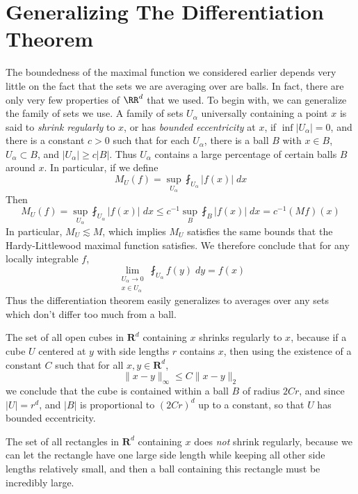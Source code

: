 \section{Generalizing The Differentiation Theorem}

The boundedness of the maximal function we considered earlier depends very little on the fact that the sets we are averaging over are balls. In fact, there are only very few properties of $\RR^d$ that we used. To begin with, we can generalize the family of sets we use. A family of sets $U_\alpha$ universally containing a point $x$ is said to \emph{shrink regularly} to $x$, or has \emph{bounded eccentricity} at $x$, if $\inf |U_\alpha| = 0$, and there is a constant $c > 0$ such that for each $U_\alpha$, there is a ball $B$ with $x \in B$, $U_\alpha \subset B$, and $|U_\alpha| \geq c |B|$. Thus $U_\alpha$ contains a large percentage of certain balls $B$ around $x$. In particular, if we define
%
\[ M_U(f) = \sup_{U_\alpha} \fint_{U_\alpha} |f(x)|\; dx \]
%
Then
%
\[ M_U(f) = \sup_{U_\alpha} \fint_{U_\alpha} |f(x)|\; dx \leq c^{-1} \sup_B \fint_B |f(x)|\; dx = c^{-1} (Mf)(x) \]
%
In particular, $M_U \lesssim M$, which implies $M_U$ satisfies the same bounds that the Hardy-Littlewood maximal function satisfies. We therefore conclude that for any locally integrable $f$,
%
\[ \lim_{\substack{U_\alpha \to 0\\x \in U_\alpha}} \fint_{U_\alpha} f(y)\;dy = f(x) \]
%
Thus the differentiation theorem easily generalizes to averages over any sets which don't differ too much from a ball.

\begin{example}
    The set of all open cubes in $\mathbf{R}^d$ containing $x$ shrinks regularly to $x$, because if a cube $U$ centered at $y$ with side lengths $r$ contains $x$, then using the existence of a constant $C$ such that for all $x,y \in \mathbf{R}^d$,
    \[ \| x - y \|_\infty \leq C \| x - y \|_2 \]
    we conclude that the cube is contained within a ball $B$ of radius $2Cr$, and since $|U| = r^d$, and $|B|$ is proportional to $(2Cr)^d$ up to a constant, so that $U$ has bounded eccentricity.
\end{example}

\begin{example}
    The set of all rectangles in $\mathbf{R}^d$ containing $x$ does {\it not} shrink regularly, because we can let the rectangle have one large side length while keeping all other side lengths relatively small, and then a ball containing this rectangle must be incredibly large.
\end{example}

